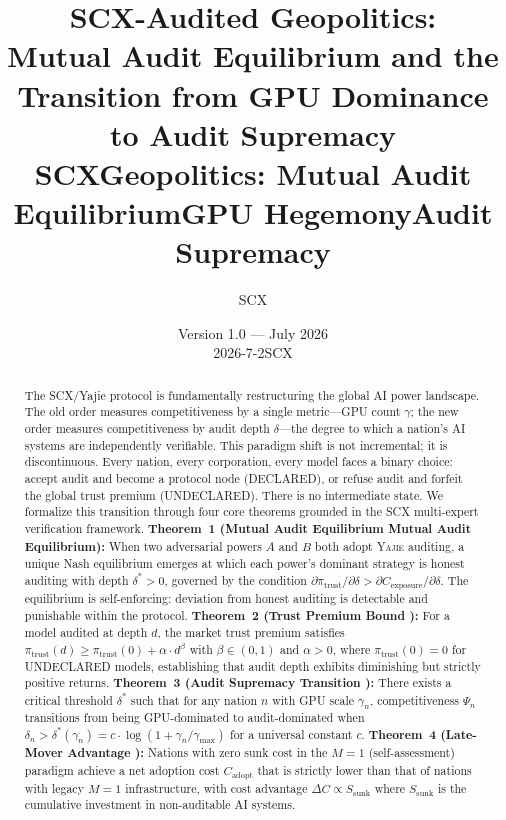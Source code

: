 \documentclass[11pt,a4paper]{article}
\title{\textbf{SCX-Audited Geopolitics:}\\
\large Mutual Audit Equilibrium and the Transition from GPU Dominance to Audit Supremacy\\
\medskip
\normalsize\textbf{SCXGeopolitics: Mutual Audit EquilibriumGPU HegemonyAudit Supremacy}}
\author{SCX}
\date{Version 1.0 --- July 2026\\
\small 2026-7-2SCX}
\theoremstyle{definition}
\theoremstyle{remark}
\newcommand{\SCX}{\textsc{SCX}}
\newcommand{\Yajie}{\textsc{Yajie}}
\newcommand{\declaredState}{\textsf{DECLARED}}
\newcommand{\undeclaredState}{\textsf{UNDECLARED}}
\newcommand{\trustPremium}{\pi_{\text{trust}}}
\newcommand{\auditDepth}{\delta}
\newcommand{\gpuScale}{\gamma}
\newcommand{\competitiveness}{\Psi}
\newcommand{\MAone}{M=1}
\begin{document}
\maketitle
\begin{abstract}
The SCX/Yajie protocol is fundamentally restructuring the global AI power landscape. The old order measures competitiveness by a single metric---GPU count $\gpuScale$; the new order measures competitiveness by audit depth $\auditDepth$---the degree to which a nation's AI systems are independently verifiable. This paradigm shift is not incremental; it is discontinuous. Every nation, every corporation, every model faces a binary choice: accept audit and become a protocol node (\declaredState), or refuse audit and forfeit the global trust premium (\undeclaredState). There is no intermediate state.
We formalize this transition through four core theorems grounded in the \SCX{} multi-expert verification framework. \textbf{Theorem~1 (Mutual Audit Equilibrium Mutual Audit Equilibrium):} When two adversarial powers $A$ and $B$ both adopt \Yajie{} auditing, a unique Nash equilibrium emerges at which each power's dominant strategy is honest auditing with depth $\auditDepth^* > 0$, governed by the condition $\partial \trustPremium / \partial \auditDepth > \partial C_{\text{exposure}} / \partial \auditDepth$. The equilibrium is self-enforcing: deviation from honest auditing is detectable and punishable within the protocol. \textbf{Theorem~2 (Trust Premium Bound ):} For a model audited at depth $d$, the market trust premium satisfies $\trustPremium(d) \geq \trustPremium(0) + \alpha \cdot d^{\beta}$ with $\beta \in (0, 1)$ and $\alpha > 0$, where $\trustPremium(0) = 0$ for \undeclaredState{} models, establishing that audit depth exhibits diminishing but strictly positive returns. \textbf{Theorem~3 (Audit Supremacy Transition ):} There exists a critical threshold $\auditDepth^*$ such that for any nation $n$ with GPU scale $\gpuScale_n$, competitiveness $\competitiveness_n$ transitions from being GPU-dominated to audit-dominated when $\auditDepth_n > \auditDepth^*(\gpuScale_n) = c \cdot \log(1 + \gpuScale_n / \gpuScale_{\max})$ for a universal constant $c$. \textbf{Theorem~4 (Late-Mover Advantage ):} Nations with zero sunk cost in the $\MAone$ (self-assessment) paradigm achieve a net adoption cost $C_{\text{adopt}}$ that is strictly lower than that of nations with legacy $\MAone$ infrastructure, with cost advantage $\Delta C \propto S_{\text{sunk}}$ where $S_{\text{sunk}}$ is the cumulative investment in non-auditable AI systems.

\end{abstract}
\end{document}
